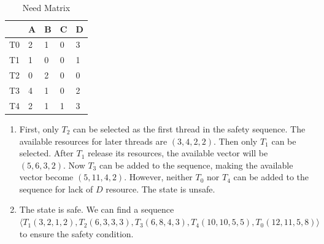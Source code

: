 \begin{exercise}[]
\begin{solution}
  \begin{table}[ht]
    \centering
    \begin{tabular}{lllll}
    \hline
       & A & B & C & D \\ \hline
    T0 & 2 & 1 & 0 & 3 \\
    T1 & 1 & 0 & 0 & 1 \\
    T2 & 0 & 2 & 0 & 0 \\
    T3 & 4 & 1 & 0 & 2 \\
    T4 & 2 & 1 & 1 & 3 \\ \hline
    \end{tabular}
    \caption{Need Matrix \label{2-1}}
    \end{table}
    \begin{enumerate}
        \item First, only $T_2$ can be selected as the first thread in the safety sequence. The available resources for later threads are $(3,4,2,2)$. Then only $T_1$ can be selected. After $T_1$ release its resources, the available vector will be $(5,6,3,2)$. Now $T_3$ can be added to the sequence, making the available vector become $(5,11,4,2)$. However, neither $T_0$ nor $T_4$ can be added to the sequence for lack of $D$ resource. The state is unsafe.
        \item The state is safe. We can find a sequence $\langle T_1 (3,2,1,2), T_2 (6,3,3,3),T_3 (6,8,4,3),T_4(10,10,5,5),T_0(12,11,5,8)\rangle$ to ensure the safety condition.
    \end{enumerate}
  \end{solution}
  \label{ex2}
\end{exercise}

\newpage

